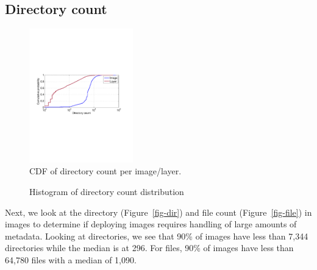 \subsection{Directory count}
\begin{figure}
	\centering
	\includegraphics[width=0.4\textwidth]{graphs/dir-cnt-cdf.pdf}
	\caption{CDF of directory count per image/layer.
	}
	\label{fig:reference-cnt}
\end{figure}

\begin{figure}[!t]
	\centering
	\caption{Histogram of directory count distribution}
	\label{fig:reference-cnt}
\end{figure}

Next, we look at the directory (Figure~\ref{fig-dir}) and file count
(Figure~\ref{fig-file}) in images to determine if deploying images requires
handling of large amounts of metadata. Looking at directories, we see that 90\%
of images have less than 7,344 directories while the median is at 296. For
files, 90\% of images have less than 64,780 files with a median of 1,090.

